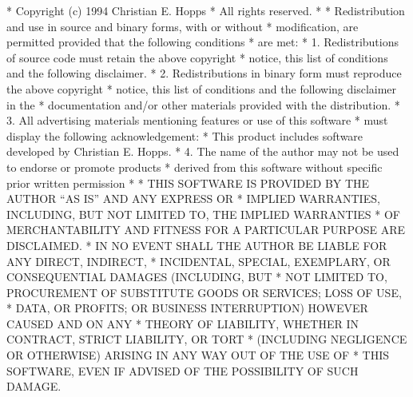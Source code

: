 \begin{copyrightEnv}
 * Copyright (c) 1994 Christian E. Hopps
 * All rights reserved.
 *
 * Redistribution and use in source and binary forms, with or without
 * modification, are permitted provided that the following conditions
 * are met:
 * 1. Redistributions of source code must retain the above copyright
 *    notice, this list of conditions and the following disclaimer.
 * 2. Redistributions in binary form must reproduce the above copyright
 *    notice, this list of conditions and the following disclaimer in the
 *    documentation and/or other materials provided with the distribution.
 * 3. All advertising materials mentioning features or use of this software
 *    must display the following acknowledgement:
 *      This product includes software developed by Christian E. Hopps.
 * 4. The name of the author may not be used to endorse or promote products
 *    derived from this software without specific prior written permission
 *
 * THIS SOFTWARE IS PROVIDED BY THE AUTHOR ``AS IS'' AND ANY EXPRESS OR
 * IMPLIED WARRANTIES, INCLUDING, BUT NOT LIMITED TO, THE IMPLIED WARRANTIES
 * OF MERCHANTABILITY AND FITNESS FOR A PARTICULAR PURPOSE ARE DISCLAIMED.
 * IN NO EVENT SHALL THE AUTHOR BE LIABLE FOR ANY DIRECT, INDIRECT,
 * INCIDENTAL, SPECIAL, EXEMPLARY, OR CONSEQUENTIAL DAMAGES (INCLUDING, BUT
 * NOT LIMITED TO, PROCUREMENT OF SUBSTITUTE GOODS OR SERVICES; LOSS OF USE,
 * DATA, OR PROFITS; OR BUSINESS INTERRUPTION) HOWEVER CAUSED AND ON ANY
 * THEORY OF LIABILITY, WHETHER IN CONTRACT, STRICT LIABILITY, OR TORT
 * (INCLUDING NEGLIGENCE OR OTHERWISE) ARISING IN ANY WAY OUT OF THE USE OF
 * THIS SOFTWARE, EVEN IF ADVISED OF THE POSSIBILITY OF SUCH DAMAGE.
\end{copyrightEnv}

